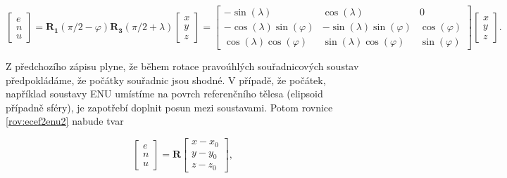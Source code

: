 \documentclass[11pt,a4paper]{article}
\begin{document}
\begin{equation}
\begin{bmatrix}
e \\
n \\
u
\end{bmatrix} =
\mathbf{R_{1}}\left(\pi/2-\varphi\right)\mathbf{R_{3}}\left(\pi/2+\lambda\right)
\begin{bmatrix}
x \\
y \\
z
\end{bmatrix} =
\begin{bmatrix}
-\sin{\left(\lambda\right)} & \cos{\left(\lambda\right)} & 0 \\
-\cos{\left(\lambda\right)}\sin{\left(\varphi\right)} & -\sin{\left(\lambda\right)}\sin{\left(\varphi\right)} & \cos{\left(\varphi\right)} \\
\cos{\left(\lambda\right)}\cos{\left(\varphi\right)} & \sin{\left(\lambda\right)}\cos{\left(\varphi\right)} & \sin{\left(\varphi\right)}
\end{bmatrix}
\begin{bmatrix}
x \\
y \\
z
\end{bmatrix}.
\label{rov:ecef2enu2}
\end{equation}

Z předchozího zápisu plyne, že během rotace pravoúhlých souřadnicových soustav předpokládáme, že počátky souřadnic jsou shodné. V případě, že počátek, například soustavy ENU umístíme na povrch referenčního tělesa (elipsoid případně sféry), je zapotřebí doplnit posun mezi soustavami. Potom rovnice \ref{rov:ecef2enu2} nabude tvar

\begin{equation}
\begin{bmatrix}
e \\
n \\
u
\end{bmatrix} =
\mathbf{R}
\begin{bmatrix}
x - x_{0} \\
y - y_{0} \\
z - z_{0}
\end{bmatrix},
\label{rov:ecef2enu22}
\end{equation}
\end{document}
